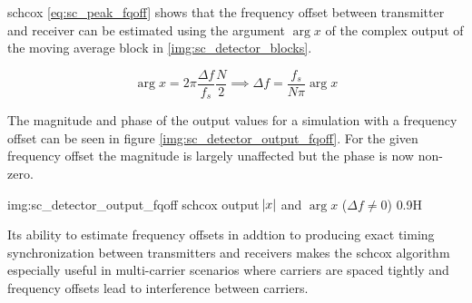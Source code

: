 \begin{subchapter}{\acrlong{schcox}}
  \autoref{eq:sc_peak_fqoff} shows that the frequency offset between transmitter
  and receiver can be estimated using the argument $\arg{x}$ of the complex output of the
  moving average block in \autoref{img:sc_detector_blocks}.

  \begin{equation*}
    \arg{x} = 2 \pi \frac{\Delta f}{f_s} \frac{N}{2} \implies \Delta f = \frac{f_s}{N \pi} \arg{x}
  \end{equation*}

  The magnitude and phase of the output values for a simulation with a
  frequency offset can be seen in figure \ref{img:sc_detector_output_fqoff}.
  For the given frequency offset the magnitude is largely unaffected but
  the phase is now non-zero.

               {img:sc_detector_output_fqoff}
               {\acrshort{schcox} output $\abs{x}$ and $\arg{x}$ ($\Delta f \neq 0$)}
               {0.9}{H}
\end{subchapter}

Its ability to estimate frequency offsets in addtion to producing
exact timing synchronization between transmitters and
receivers makes the \acrshort{schcox} algorithm especially useful
in multi-carrier scenarios where carriers are spaced tightly and
frequency offsets lead to interference between carriers.
